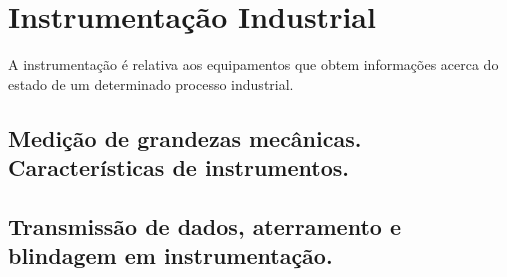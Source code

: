 \chapter{Instrumentação Industrial}

A instrumentação é relativa aos equipamentos que obtem informações acerca do estado de um determinado processo industrial.
\section{Medição de grandezas mecânicas. Características de instrumentos.}
\section{Transmissão de dados, aterramento e blindagem em instrumentação.}
